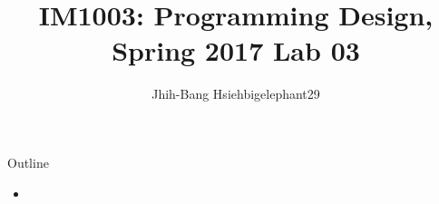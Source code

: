 \documentclass[t]{beamer}
\title{IM1003: Programming Design, Spring 2017  \linebreak Lab 03}
\author[bigelephant29]{Jhih-Bang Hsieh\linebreak \small{bigelephant29}}
\institute{\textbf{National Taiwan University}}
\date{}
\begin{document}
\begin{frame}
  \maketitle
\end{frame}

\begin{frame}{Outline}
  \begin{itemize}
    \item
  \end{itemize}
\end{frame}

\end{document}
